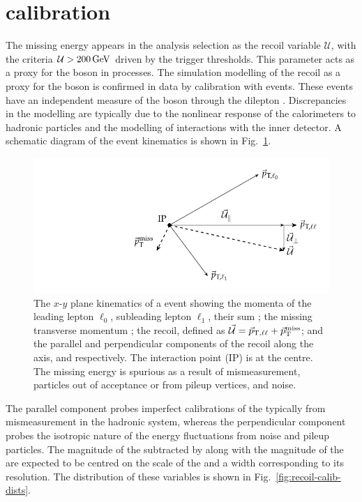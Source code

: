 \section{\ptmiss calibration}\label{sec:ptmiss-calib}

The missing energy appears in the analysis selection as the recoil variable $\mathcal{U}$, with the criteria ${\mathcal{U}>\SI{200}{GeV}}$ driven by the trigger thresholds. This parameter acts as a proxy for the boson \pt in \IVj processes. The simulation modelling of the recoil as a proxy for the boson \pt is confirmed in data by calibration with \diellplusjets events. These events have an independent measure of the boson \pt through the dilepton \pt. Discrepancies in the modelling are typically due to the nonlinear response of the calorimeters to hadronic particles and the modelling of interactions with the inner detector. A schematic diagram of the event kinematics is shown in Fig.~\ref{fig:recoil-calib-diagram}.

\begin{figure}[htb]
    \centering
    \includegraphics{diagrams/tikz/recoil_calib/recoil_calib.pdf}
    \caption[Kinematics diagram of a \IDYllj events.]{
        The $x$-$y$ plane kinematics of a \IDYllj event showing the momenta of the leading lepton $\ell_0$, subleading lepton $\ell_1$, their sum \vecptll; the missing transverse momentum \vecptmiss; the recoil, defined as $\vec{\mathcal{U}}=\vec{p}_{\mathrm{T},\ell\ell}+\vec{p}_{\text{T}}^{\mathrm{miss}}$; and the parallel and perpendicular components of the recoil along the \vecptll axis, \vecrecoilpara and \vecrecoilperp respectively. The interaction point (IP) is at the centre. The missing energy is spurious as a result of mismeasurement, particles out of acceptance or from pileup vertices, and noise.
    }
    \label{fig:recoil-calib-diagram}
\end{figure}

The parallel component \vecrecoilpara probes imperfect calibrations of the \ptmiss typically from mismeasurement in the hadronic system, whereas the perpendicular component \vecrecoilperp probes the isotropic nature of the energy fluctuations from noise and pileup particles. The magnitude of the \vecrecoilpara subtracted by \vecptll along with the magnitude of the \vecrecoilperp are expected to be centred on the scale of the \ptmiss and a width corresponding to its resolution. The distribution of these variables is shown in Fig.~\ref{fig:recoil-calib-dists}.

